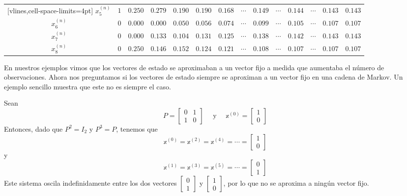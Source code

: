 \begin{example}
\begin{table}[h!]
\begin{NiceTabular}{cccccccccccccc}[vlines,cell-space-limits=4pt]
            $x_5^{(n)}$ & $1$ & $0.250$ & $0.279$ & $0.190$ & $0.190$ & $0.168$ & $\cdots$ & $0.149$ & $\cdots$ & $0.144$ & $\cdots$ & $0.143$ & $0.143$ \\
            $x_6^{(n)}$ & $0$ & $0.000$ & $0.000$ & $0.050$ & $0.056$ & $0.074$ & $\cdots$ & $0.099$ & $\cdots$ & $0.105$ & $\cdots$ & $0.107$ & $0.107$ \\
            $x_7^{(n)}$ & $0$ & $0.000$ & $0.133$ & $0.104$ & $0.131$ & $0.125$ & $\cdots$ & $0.138$ & $\cdots$ & $0.142$ & $\cdots$ & $0.143$ & $0.143$ \\
            $x_8^{(n)}$ & $0$ & $0.250$ & $0.146$ & $0.152$ & $0.124$ & $0.121$ & $\cdots$ & $0.108$ & $\cdots$ & $0.107$ & $\cdots$ & $0.107$ & $0.107$ \\
            \hline
        \end{NiceTabular}
        \caption{~}
        \label{table:markov2}
    \end{table}\vspace{-0.5cm}
\end{example}

En nuestros ejemplos vimos que los vectores de estado se aproximaban a un vector fijo a medida que aumentaba el número de observaciones. Ahora nos preguntamos si los vectores de estado siempre se aproximan a un vector fijo en una cadena de Markov. Un ejemplo sencillo muestra que este no es siempre el caso.

\begin{example}
    Sean
    $$P = \begin{bmatrix}
        0 & 1 \\
        1 & 0
    \end{bmatrix} \quad \text{ y } \quad \mathbb{x}^{(0)} = \begin{bmatrix}
        1 \\
        0
    \end{bmatrix}$$
    Entonces, dado que $P^2 = I_2$ y $P^3 = P$, tenemos que
    $$\mathbb{x}^{(0)} = \mathbb{x}^{(2)} = \mathbb{x}^{(4)} = \cdots = \begin{bmatrix} 1 \\ 0 \end{bmatrix}$$
    y
    $$\mathbb{x}^{(1)} = \mathbb{x}^{(3)} = \mathbb{x}^{(5)} = \cdots = \begin{bmatrix} 0 \\ 1 \end{bmatrix}$$
    Este sistema oscila indefinidamente entre los dos vectores $\begin{bmatrix} 0 \\ 1 \end{bmatrix}$ y $\begin{bmatrix} 1 \\ 0 \end{bmatrix}$, por lo que no se aproxima a ningún vector fijo.
\end{example}

